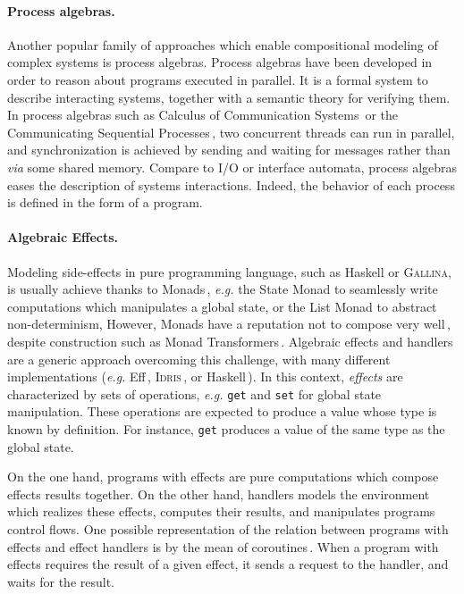 \paragraph{Process algebras.}
%
Another popular family of approaches which enable compositional modeling of
complex systems is process algebras.
%
Process algebras have been developed in order to reason about programs executed
in parallel.
%
It is a formal system to describe interacting systems, together with a semantic
theory for verifying them.
%
In process algebras such as Calculus of Communication
Systems\,\cite{milner1980ccs} or the Communicating Sequential
Processes\,\cite{hoare1978csp}, two concurrent threads can run in parallel, and
synchronization is achieved by sending and waiting for messages rather than
\emph{via} some shared memory.
%
Compare to I/O or interface automata, process algebras eases the description of
systems interactions.
%
Indeed, the behavior of each process is defined in the form of a program.

\paragraph{Algebraic Effects.}
%
Modeling side-effects in pure programming language, such as Haskell or {\scshape
  Gallina}, is usually achieve thanks to
Monads\,\cite{wadler1990comprehending,jones2005io}, \emph{e.g.} the State Monad
to seamlessly write computations which manipulates a global state, or the List
Monad to abstract non-determinism,
%
However, Monads have a reputation not to compose very
well\,\cite{hyland2006combining}, despite construction such as Monad
Transformers\,\cite{liang1995mtl}.
%
Algebraic effects and handlers are a generic approach overcoming this challenge,
with many different implementations (\emph{e.g.} Eff\,\cite{bauer2015effects},
{\scshape Idris}\,\cite{brady2013idris}, or
Haskell\,\cite{kiselyov2013extensible}).
%
In this context, \emph{effects} are characterized by sets of operations,
\emph{e.g.} \texttt{get} and \texttt{set} for global state manipulation.
%
These operations are expected to produce a value whose type is known by
definition.
%
For instance, \texttt{get} produces a value of the same type as the global
state.

On the one hand, programs with effects are pure computations which compose
effects results together.
%
On the other hand, handlers models the environment which realizes these effects,
computes their results, and manipulates programs control flows.
%
One possible representation of the relation between programs with effects and
effect handlers is by the mean of coroutines\,\cite{kiselyov2013extensible}.
%
When a program with effects requires the result of a given effect, it sends a
request to the handler, and waits for the result.

